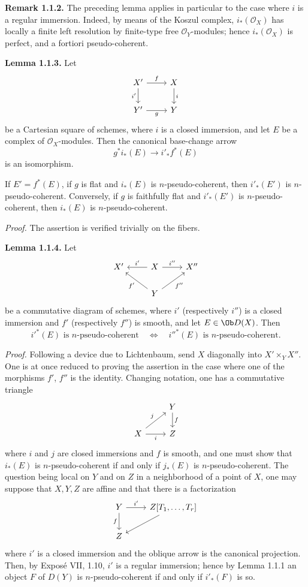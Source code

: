 \textbf{Remark 1.1.2.} The preceding lemma applies in particular to the case where \(i\) is a regular immersion. Indeed, by means of the Koszul complex, \(i_*(\mathcal O_X)\) has locally a finite left resolution by finite-type free \(\mathcal O_Y\)-modules; hence \(i_*(\mathcal O_X)\) is perfect, and a fortiori pseudo-coherent.

\textbf{Lemma 1.1.3.} Let
\[
\begin{tikzcd}
X' \arrow[r,"f"] \arrow[d,"i'"'] & X \arrow[d,"i"]\\
Y' \arrow[r,"g"'] & Y
\end{tikzcd}
\]
be a Cartesian square of schemes, where \(i\) is a closed immersion, and let \(E\) be a complex of \(\mathcal O_X\)-modules. Then the canonical base-change arrow
\[
  g^*i_*(E)\longrightarrow i'_*f^*(E)
\]
is an isomorphism.

If \(E'=f^*(E)\), if \(g\) is flat and \(i_*(E)\) is \(n\)-pseudo-coherent, then \(i'_*(E')\) is \(n\)-pseudo-coherent. Conversely, if \(g\) is faithfully flat and \(i'_*(E')\) is \(n\)-pseudo-coherent, then \(i_*(E)\) is \(n\)-pseudo-coherent.

\emph{Proof.} The assertion is verified trivially on the fibers.

\textbf{Lemma 1.1.4.} Let
\[
\begin{tikzcd}
X' & X \arrow[l,"i'"'] \arrow[r,"i''"] & X''\\
& Y \arrow[ul,"f'"] \arrow[ur,"f''"'] &
\end{tikzcd}
\]
be a commutative diagram of schemes, where \(i'\) (respectively \(i''\)) is a closed immersion and \(f'\) (respectively \(f''\)) is smooth, and let \(E\in \Ob D(X)\). Then
\[
  i'^*(E)\text{ is }n\text{-pseudo-coherent}
  \quad\Longleftrightarrow\quad
  i''^*(E)\text{ is }n\text{-pseudo-coherent}.
\]

\emph{Proof.} Following a device due to Lichtenbaum, send \(X\) diagonally into \(X'\times_YX''\). One is at once reduced to proving the assertion in the case where one of the morphisms \(f'\), \(f''\) is the identity. Changing notation, one has a commutative triangle
\[
\begin{tikzcd}
& Y \arrow[d,"f"]\\
X \arrow[r,"i"'] \arrow[ur,"j"] & Z
\end{tikzcd}
\]
where \(i\) and \(j\) are closed immersions and \(f\) is smooth, and one must show that \(i_*(E)\) is \(n\)-pseudo-coherent if and only if \(j_*(E)\) is \(n\)-pseudo-coherent. The question being local on \(Y\) and on \(Z\) in a neighborhood of a point of \(X\), one may suppose that \(X,Y,Z\) are affine and that there is a factorization
\[
\begin{tikzcd}
Y \arrow[r,"i'"] \arrow[d,"f"'] & Z[T_1,\ldots,T_r]\arrow[dl]\\
Z&
\end{tikzcd}
\]
where \(i'\) is a closed immersion and the oblique arrow is the canonical projection. Then, by Exposé VII, 1.10, \(i'\) is a regular immersion; hence by Lemma 1.1.1 an object \(F\) of \(D(Y)\) is \(n\)-pseudo-coherent if and only if \(i'_*(F)\) is so.

